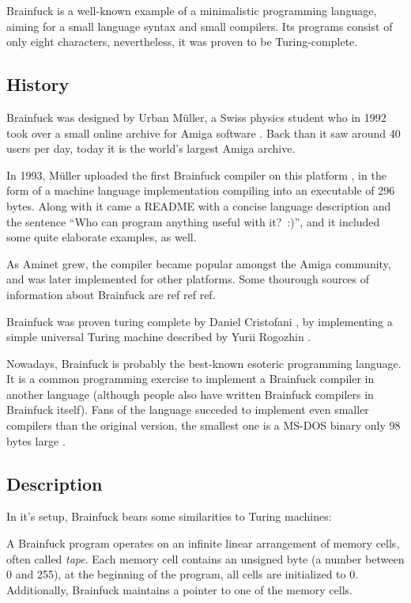 Brainfuck is a well-known example of a minimalistic programming language, aiming for a small language syntax and small compilers. Its programs consist of only eight characters, nevertheless, it was proven to be Turing-complete.

\subsection{History}

Brainfuck was designed by Urban Müller, a Swiss physics student who in 1992 took over a small online archive for Amiga software \cite{muller1993aminet}. Back than it saw around 40 users per day, today it is the world's largest Amiga archive.

In 1993, Müller uploaded the first Brainfuck compiler on this platform \cite{muller1993240}, in the form of a machine language implementation compiling into an executable of 296 bytes. Along with it came a README with a concise language description and the sentence “Who can program anything useful with it?~:)”, and it included some quite elaborate examples, as well.

As Aminet grew, the compiler became popular amongst the Amiga community, and was later implemented for other platforms. Some thourough sources of information about Brainfuck are ref ref ref.

Brainfuck was proven turing complete by Daniel Cristofani \cite{cristofani-universal}, by implementing a simple universal Turing machine described by Yurii Rogozhin \cite{rogozhin1996small}.

Nowadays, Brainfuck is probably the best-known esoteric programming language. It is a common programming exercise to implement a Brainfuck compiler in another language (although people also have written Brainfuck compilers in Brainfuck itself). Fans of the language succeded to implement even smaller compilers than the original version, the smallest one is a MS-DOS binary only 98 bytes large \cite{inte1999entry}.

\subsection{Description}

In it's setup, Brainfuck bears some similarities to Turing machines:

A Brainfuck program operates on an infinite linear arrangement of memory cells, often called \emph{tape}. Each memory cell contains an unsigned byte (a number between 0 and 255), at the beginning of the program, all cells are initialized to 0. Additionally, Brainfuck maintains a pointer to one of the memory cells.

